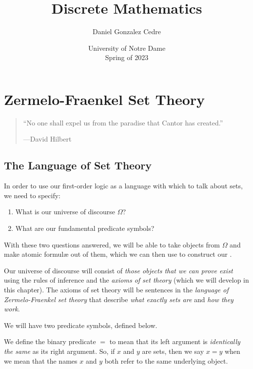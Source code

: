 





\title{Discrete Mathematics}
\author{Daniel Gonzalez Cedre}
\date{University of Notre Dame \\ Spring of 2023}
\maketitle

\setcounter{chapter}{2}
\chapter{Zermelo-Fraenkel Set Theory}
\begin{quote}
    ``No one shall expel us from the paradise that Cantor has created.''
    \begin{flushright}
        ---David Hilbert
    \end{flushright}
\end{quote}

\section{The Language of Set Theory}
In order to use our first-order logic as a language with which to talk about sets,
we need to specify:
\begin{enumerate}
    \item
        What is our universe of discourse \(\Omega\)?
    \item
        What are our fundamental predicate symbols?
\end{enumerate}
With these two questions answered,
we will be able to take objects from \(\Omega\) and make atomic formul{\ae} out of them,
which we can then use to construct our {\wff}.

Our universe of discourse will consist of \emph{those objects that we can prove exist}
using the rules of inference and the \emph{axioms of set theory} (which we will develop in this chapter).
The axioms of set theory will be sentences in the \emph{language of Zermelo-Fraenkel set theory}
that describe \emph{what exactly sets are} and \emph{how they work}.

We will have two predicate symbols, defined below.

\begin{definition}[Equality]\label{def:equal}
    We define the binary predicate \(=\) to mean that
    its left argument is \emph{identically the same} as its right argument.
    So, if \(x\) and \(y\) are sets, then we say \(x = y\)
    when we mean that the names \(x\) and \(y\) both refer to the same underlying object.
\end{definition}

